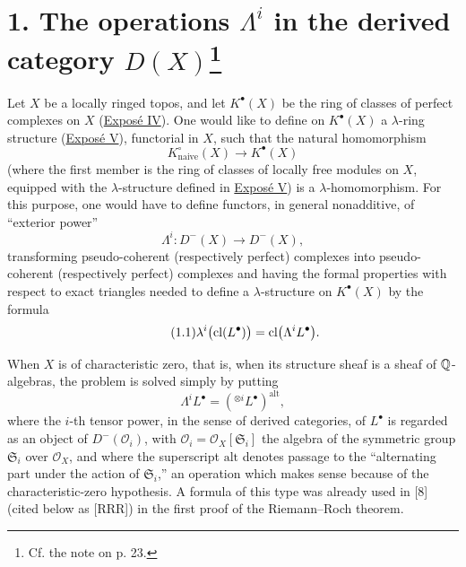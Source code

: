 \section*{1. The operations $\Lambda^i$ in the derived category $D(X)$\footnote{Cf. the note on p. 23.}}

Let $X$ be a locally ringed topos, and let $K^\bullet(X)$ be the ring of classes of perfect complexes on $X$ (\hyperlink{sga6.e04.expose}{Expos\'e IV}). One would like to define on $K^\bullet(X)$ a $\lambda$-ring structure (\hyperlink{sga6.e05.expose}{Expos\'e V}), functorial in $X$, such that the natural homomorphism
\[
  K^\circ_{\mathrm{naive}}(X)\longrightarrow K^\bullet(X)
\]
(where the first member is the ring of classes of locally free modules on $X$, equipped with the $\lambda$-structure defined in \hyperlink{sga6.e05.expose}{Expos\'e V}) is a $\lambda$-homomorphism. For this purpose, one would have to define functors, in general nonadditive, of ``exterior power''
\[
  \Lambda^i:D^-(X)\longrightarrow D^-(X),
\]
transforming pseudo-coherent (respectively perfect) complexes into pseudo-coherent (respectively perfect) complexes and having the formal properties with respect to exact triangles needed to define a $\lambda$-structure on $K^\bullet(X)$ by the formula
\begin{equation}\tag{1.1}
  \lambda^i\bigl(\operatorname{cl}(L^\bullet)\bigr)
  =\operatorname{cl}\bigl(\Lambda^iL^\bullet\bigr).
\end{equation}

When $X$ is of characteristic zero, that is, when its structure sheaf is a sheaf of $\mathbb Q$-algebras, the problem is solved simply by putting
\begin{equation}\tag{1.2}
  \Lambda^iL^\bullet
  =\left({}^{\otimes i}L^\bullet\right)^{\mathrm{alt}},
\end{equation}
where the $i$-th tensor power, in the sense of derived categories, of
$L^\bullet$ is regarded as an object of $D^-(\mathcal O_i)$, with
$\mathcal O_i=\mathcal O_X[\mathfrak S_i]$ the algebra of the symmetric
group $\mathfrak S_i$ over $\mathcal O_X$, and where the superscript
\(\mathrm{alt}\) denotes passage to the ``alternating part under the
action of $\mathfrak S_i$,'' an operation which makes sense because of
the characteristic-zero hypothesis. A formula of this type was already
used in [8] (cited below as [RRR]) in the first proof of the
Riemann--Roch theorem.

